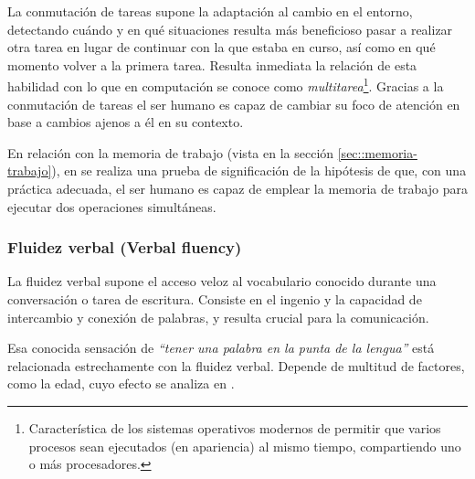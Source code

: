 La conmutación de tareas supone la adaptación al cambio en el entorno, detectando cuándo y en qué situaciones resulta más beneficioso pasar a realizar otra tarea en lugar de continuar con la que estaba en curso, así como en qué momento volver a la primera tarea. Resulta inmediata la relación de esta habilidad con lo que en computación se conoce como {\it multitarea}\footnote{Característica de los sistemas operativos modernos de permitir que varios procesos sean ejecutados (en apariencia) al mismo tiempo, compartiendo uno o más procesadores.}. Gracias a la conmutación de tareas el ser humano es capaz de cambiar su foco de atención en base a cambios ajenos a él en su contexto.

En relación con la memoria de trabajo (vista en la sección \ref{sec::memoria-trabajo}), en \cite{Klaus2004} se realiza una prueba de significación de la hipótesis de que, con una práctica adecuada, el ser humano es capaz de emplear la memoria de trabajo para ejecutar dos operaciones simultáneas.

\subsubsection{Fluidez verbal (Verbal fluency)}

La fluidez verbal supone el acceso veloz al vocabulario conocido durante una conversación o tarea de escritura. Consiste en el ingenio y la capacidad de intercambio y conexión de palabras, y resulta crucial para la comunicación.

Esa conocida sensación de {\it ``tener una palabra en la punta de la lengua''} está relacionada estrechamente con la fluidez verbal. Depende de multitud de factores, como la edad, cuyo efecto se analiza en \cite{Deborah2004}.
